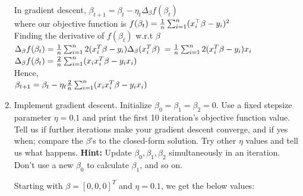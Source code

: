 \documentclass[a4paper]{article}
\theoremstyle{definition}
\newenvironment{soln}{
    \leavevmode\color{blue}\ignorespaces
}{}
\begin{document}
\begin{enumerate}
\begin{soln}
In gradient descent, $\beta_{t+1} = \beta_t - \eta_t \Delta_\beta f(\beta_t)$\\
where our objective function is $f(\beta_t) = {1\over n} \sum_{i=1}^n (x_i^\top \beta - y_i)^2$\\
Finding the derivative of $f(\beta_t)$ w.r.t $\beta$\\
$\Delta_\beta f(\beta_t) = {1\over n} \sum_{i=1}^{n}2(x_i^T\beta - y_i)\Delta_\beta(x_i^T\beta)$ $ = {1\over n} \sum_{i=1}^{n}2(x_i^T\beta - y_i)x_i$\\
$ \Delta_\beta f(\beta_t) = {2\over n} \sum_{i=1}^{n}(x_ix_i^T\beta - y_ix_i)$\\
Hence,\\
$\beta_{t+1} = \beta_t - \eta_t {2\over n} \sum_{i=1}^{n}(x_ix_i^T\beta - y_ix_i)$\\

\end{soln}

\item
Implement gradient descent.  Initialize $\beta_0= \beta_1= \beta_2=0$.  Use a fixed stepsize parameter $\eta=0.1$ and print the first 10 iteration's objective function value.
Tell us if further iterations make your gradient descent converge, and if yes when; compare the $\beta$'s to the closed-form solution.
Try other $\eta$ values and tell us what happens.
\textbf{Hint:} Update $\beta_0, \beta_1, \beta_2$ simultaneously in an iteration.  Don't use a new $\beta_0$ to calculate $\beta_1$, and so on.

\begin{soln}
	
Starting with $\beta = [0, 0, 0]^T$ and $\eta=0.1$, we get the below values: 


\end{soln}
\end{enumerate}
\end{document}

